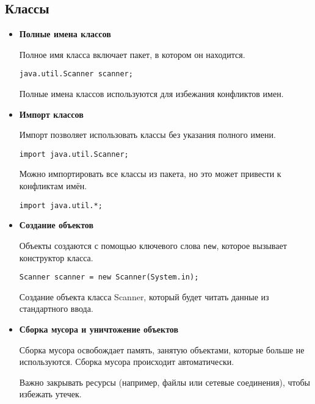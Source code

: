 \subsection{Классы}
\begin{itemize}
    \item \textbf{Полные имена классов}\par
    Полное имя класса включает пакет, в котором он находится.
    \begin{verbatim}
java.util.Scanner scanner;
    \end{verbatim}
    Полные имена классов используются для избежания конфликтов имен.

    \item \textbf{Импорт классов}\par
    Импорт позволяет использовать классы без указания полного имени.
    \begin{verbatim}
import java.util.Scanner;
    \end{verbatim}
    Можно импортировать все классы из пакета, но это может привести к конфликтам имён.
    \begin{verbatim}
import java.util.*;
    \end{verbatim}

    \item \textbf{Создание объектов}\par
    Объекты создаются с помощью ключевого слова \texttt{new}, которое вызывает конструктор класса.
    \begin{verbatim}
Scanner scanner = new Scanner(System.in);
    \end{verbatim}
    Создание объекта класса Scanner, который будет читать данные из стандартного ввода.

    \item \textbf{Сборка мусора и уничтожение объектов}\par
    Сборка мусора освобождает память, занятую объектами, которые больше не используются. Сборка мусора происходит автоматически.\par
    Важно закрывать ресурсы (например, файлы или сетевые соединения), чтобы избежать утечек.
\end{itemize}

